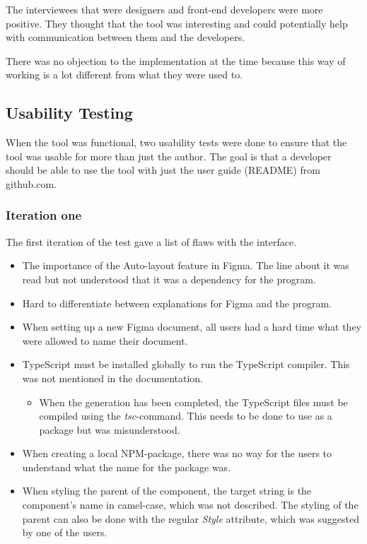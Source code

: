 The interviewees that were designers and front-end developers were more positive. They thought that the tool was interesting and could potentially help with communication between them and the developers.

There was no objection to the implementation at the time because this way of working is a lot different from what they were used to.  


\subsection{Usability Testing}%
\label{sub:Usability Testing}
When the tool was functional, two usability tests were done to ensure that the tool was usable for more than just the author. The goal is that a developer should be able to use the tool with just the user guide (README) from github.com. 

\subsubsection{Iteration one}%
\label{ssub:Iteration one}
The first iteration of the test gave a list of flaws with the interface.
\begin{itemize}
   \item The importance of the Auto-layout feature in Figma. The line about it was read but not understood that it was a dependency for the program. 
   \item Hard to differentiate between explanations for Figma and the program.
   \item When setting up a new Figma document, all users had a hard time what they were allowed to name their document.
   \item TypeScript must be installed globally to run the TypeScript compiler. This was not mentioned in the documentation. 
      \begin{itemize}
         \item When the generation has been completed, the TypeScript files must be compiled using the \textit{tsc}-command. This needs to be done to use as a package but was misunderstood.
      \end{itemize}
   \item When creating a local NPM-package, there was no way for the users to understand what the name for the package was. 
   \item When styling the parent of the component, the target string is the component's name in camel-case, which was not described. The styling of the parent can also be done with the regular \textit{Style} attribute, which was suggested by one of the users.
\end{itemize}

